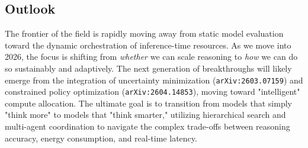 \documentclass[11pt]{article}
\begin{document}
\subsection{Outlook}

The frontier of the field is rapidly moving away from static model evaluation toward the dynamic orchestration of inference-time resources. As we move into 2026, the focus is shifting from \textit{whether} we can scale reasoning to \textit{how} we can do so sustainably and adaptively. The next generation of breakthroughs will likely emerge from the integration of uncertainty minimization (\texttt{arXiv:2603.07159}) and constrained policy optimization (\texttt{arXiv:2604.14853}), moving toward "intelligent" compute allocation. The ultimate goal is to transition from models that simply "think more" to models that "think smarter," utilizing hierarchical search and multi-agent coordination to navigate the complex trade-offs between reasoning accuracy, energy consumption, and real-time latency.
\end{document}
